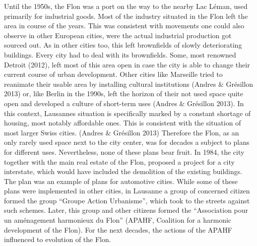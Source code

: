 \documentclass[a4paper,
fontsize=11pt,
oneside,
numbers=noperiodatend,
parskip=half-,
bibliography=totoc,
final
]{scrartcl}
\begin{document}
Until the 1950s, the Flon was a port on the way to the nearby Lac Léman,
used primarily for industrial goods. Most of the industry situated in
the Flon left the area in course of the years. This was consistent with
movements one could also observe in other European cities, were the
actual industrial production got sourced out. As in other cities too,
this left brownfields of slowly deteriorating buildings. Every city had
to deal with its brownfields. Some, most renowned Detroit (2012), left
most of this area open in case the city is able to change their current
course of urban development. Other cities like Marseille tried to
reanimate their usable area by installing cultural institutions (Andres
\& Grésillon 2013) or, like Berlin in the 1990s, left the horizon of
their not used space quite open and developed a culture of short-term
uses (Andres \& Grésillon 2013). In this context, Lausannes situation is
specifically marked by a constant shortage of housing, most notably
affordable ones. This is consistent with the situation of most larger
Swiss cities. (Andres \& Grésillon 2013) Therefore the Flon, as an only
rarely used space next to the city center, was for decades a subject to
plans for different uses. Nevertheless, none of these plans bear fruit.
In 1984, the city together with the main real estate of the Flon,
proposed a project for a city interstate, which would have included the
demolition of the existing buildings. The plan was an example of plans
for automotive cities. While some of these plans were implemented in
other cities, in Lausanne a group of concerned citizen formed the group
\enquote{Groupe Action Urbanisme}, which took to the streets against
such schemes. Later, this group and other citizens formed the
\enquote{Association pour un aménagement harmonieux du Flon} (APAHF,
Coalition for a harmonic development of the Flon). For the next decades,
the actions of the APAHF influenced to evolution of the Flon.
\end{document}
